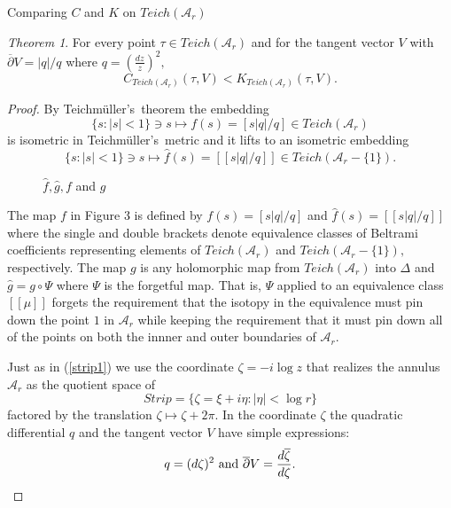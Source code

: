 \documentclass[12pt]{amsart}
\newcommand{\tes}{Teich\-m\"ul\-ler's}
\theoremstyle{remark}
\newtheorem{theorem}{Theorem}
\theoremstyle{definition}
\theoremstyle{definition}
\begin{document}
\begin{section}{Comparing $C$ and $K$ on $Teich({\mathcal A}_r)$}\label{annuli}

\begin{theorem}\label{thm5}
For every point $\tau \in Teich({\mathcal A}_r)$ and for the tangent vector $V$ with 
$\overline{\partial} V=|q|/q$ where $q=\left(\frac{dz}{z}\right)^2,$
\begin{equation}\label{e6} C_{Teich({\mathcal A}_r)}(\tau,V) < K_{Teich({\mathcal A}_r)}(\tau,V).\end{equation}
\end{theorem}
\begin{proof}
 By \tes\ theorem the embedding  
 $$\{s:|s|<1\} \ni s \mapsto  f(s)= [s|q|/q] \in Teich({\mathcal A}_r)$$
 is isometric in \tes\ metric and it lifts to an isometric embedding
  $$\{s:|s|<1\} \ni s \mapsto \hat{f}(s)= [[s|q|/q]] \in Teich({\mathcal A}_r-\{1\}).$$
 \begin{figure}[htp]\label{figure4}
\hspace{.2in}
\caption{$\hat{f}, \hat{g}, f $ and $g$}
\end{figure}

   The map $f$  in Figure 3 is defined by $f(s)=[s|q|/q]$ and $\hat{f}(s)=[[s|q|/q]]$ 
   where the single and double brackets denote equivalence classes of Beltrami coefficients representing elements of  
   $Teich({\mathcal A}_r)$ and $Teich({\mathcal A}_r-\{1\}),$ respectively.  The map $g$ is any holomorphic map from  $Teich({\mathcal A}_r)$ into $\Delta$ and $\hat{g} = g \circ \Psi$  where $\Psi$ is the forgetful map.  That is, $\Psi$ applied to an equivalence class $[[\mu]]$ 
   forgets the requirement that the isotopy in the equivalence must pin down the point $1$ in ${\mathcal A}_r$  while keeping the requirement that it must pin down all of the points on both the innner and outer boundaries of 
   $ {\mathcal A}_r.$
   


   Just as in (\ref{strip1}) we use the  coordinate $\zeta = -i \log z$  that realizes the annulus ${\mathcal A}_r$  as the quotient space of 
   $$ Strip = \{\zeta=\xi + i\eta: |\eta| < \log r\} $$
   factored by the translation $\zeta \mapsto \zeta+2 \pi.$
In the coordinate $\zeta$ the quadratic differential $q$ and the tangent vector $V$ have  simple expressions:
 $$q = (d\zeta)^2 {\rm \ and \ } \overline{\partial} V =  \frac{d \overline{\zeta}}{d \zeta}.$$
    

\end{proof}
\end{section}
\end{document}
